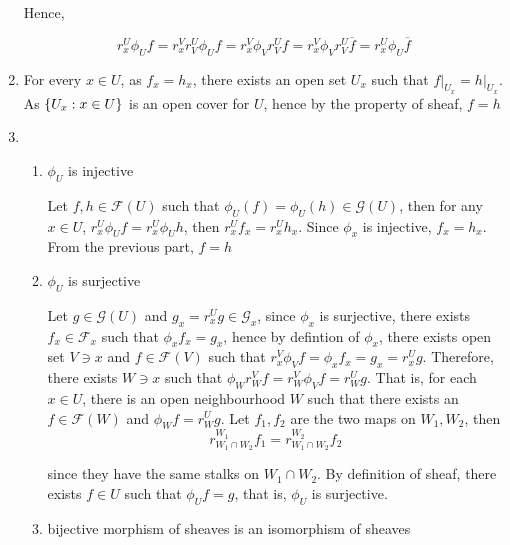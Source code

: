 \begin{remark}
\begin{longproof}
\begin{enumerate}
			Hence, 
			
			$$
				r^U_x \phi_U f = r^V_x r^U_V \phi_U f = r^V_x \phi_V r^U_V f = r^V_x \phi_V r^U_V \overline{f} = r^U_x \phi_U \overline{f}
			$$
			
			\item For every $x \in U$, as $f_x = h_x$, there exists an open set $U_x$ such that $f\vert_{U_x} = h\vert_{U_x}$. As $\{U_x: x \in U\}$ is an open cover for $U$, hence by the property of sheaf, $f = h$
			
			\item 
			\begin{enumerate}
				\item $\phi_U$ is injective
				
				Let $f, h \in \mathcal{F}(U)$ such that $\phi_U(f) = \phi_U(h) \in \mathcal{G}(U)$, then for any $x \in U$, $r^U_x \phi_U f = r^U_x \phi_U h$, then $r^U_x f_x = r^U_x h_x$. Since $\phi_x$ is injective, $f_x = h_x$. From the previous part, $f = h$
				
				\item $\phi_U$ is surjective
				
				Let $g \in \mathcal{G}(U)$ and $g_x = r^U_x g \in \mathcal{G}_x$, since $\phi_x$ is surjective,  there exists $f_x \in \mathcal{F}_x$ such that $\phi_x f_x = g_x$, hence by defintion of $\phi_x$, there exists open set $V \ni x$ and $f \in \mathcal{F}(V)$ such that $r^V_x \phi_V f = \phi_x f_x = g_x = r^U_x g$. Therefore, there exists $W \ni x$ such that $\phi_W r^V_W f= r^V_W \phi_V f = r^U_W g$. That is, for each $x \in U$, there is an open neighbourhood $W$ such that there exists an $f \in \mathcal{F}(W)$ and $\phi_W f = r^U_W g$. Let $f_1, f_2$ are the two maps on $W_1, W_2$, then
				$$
					r^{W_1}_{W_1 \cap W_2} f_1 = r^{W_2}_{W_1 \cap W_2} f_2
				$$
				
				since they have the same stalks on $W_1 \cap W_2$. By definition of sheaf, there exists $f \in U$ such that $\phi_U f = g$, that is, $\phi_U$ is surjective.
				
				\item bijective morphism of sheaves is an isomorphism of sheaves
				
			\end{enumerate}
		\end{enumerate}
	\end{longproof}
\end{remark}


\begin{remark}
\end{remark}

